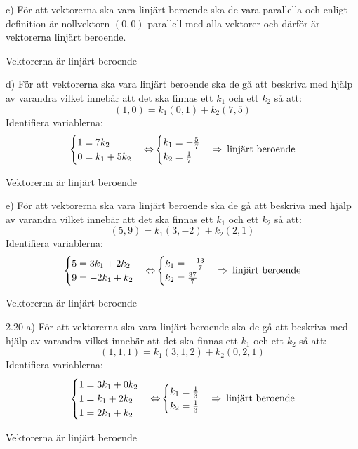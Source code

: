 \begin{task}{c)}
	För att vektorerna ska vara linjärt beroende ska de vara parallella och enligt definition är nollvektorn $(0,0)$ parallell med alla vektorer och därför är vektorerna linjärt beroende.
	
	\ans Vektorerna är linjärt beroende
\end{task}

\begin{task}{d)}
	För att vektorerna ska vara linjärt beroende ska de gå att beskriva med hjälp av varandra vilket innebär att det ska finnas ett $k_1$ och ett $k_2$ så att:
	\[(1,0)=k_1(0,1)+k_2(7,5)\]
	Identifiera variablerna:
	\[\begin{cases}
		1=7k_2 \\
		0=k_1+5k_2
	\end{cases} \operatorname{\Leftrightarrow}
	\begin{cases}
		k_1=-\frac{5}{7} \\
		k_2=\frac{1}{7}
	\end{cases} \operatorname{\Rightarrow} \text{ linjärt beroende}\]
	
	\ans Vektorerna är linjärt beroende
\end{task}

\begin{task}{e)}
	För att vektorerna ska vara linjärt beroende ska de gå att beskriva med hjälp av varandra vilket innebär att det ska finnas ett $k_1$ och ett $k_2$ så att:
	\[(5,9)=k_1(3,-2)+k_2(2,1)\]
	Identifiera variablerna:
	\[\begin{cases}
		5=3k_1+2k_2 \\
		9=-2k_1+k_2
	\end{cases} \operatorname{\Leftrightarrow}
	\begin{cases}
		k_1=-\frac{13}{7} \\
		k_2=\frac{37}{7}
	\end{cases} \operatorname{\Rightarrow} \text{ linjärt beroende}\]
	
	\ans Vektorerna är linjärt beroende
\end{task}

\begin{task}{2.20 a)}
	För att vektorerna ska vara linjärt beroende ska de gå att beskriva med hjälp av varandra vilket innebär att det ska finnas ett $k_1$ och ett $k_2$ så att:
	\[(1,1,1)=k_1(3,1,2)+k_2(0,2,1)\]
	Identifiera variablerna:
	\[\begin{cases}
		1=3k_1+0k_2 \\
		1=k_1+2k_2 \\
		1=2k_1+k_2
	\end{cases} \operatorname{\Leftrightarrow}
	\begin{cases}
		k_1=\frac{1}{3} \\
		k_2=\frac{1}{3}
	\end{cases} \operatorname{\Rightarrow} \text{ linjärt beroende}\]
	
	\ans Vektorerna är linjärt beroende
\end{task}

